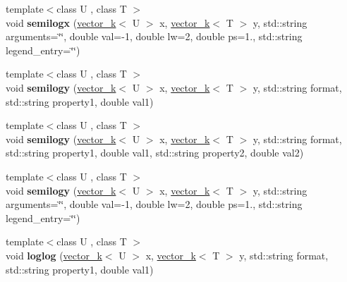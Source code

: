 \begin{DoxyCompactItemize}
\item 
\hypertarget{classkeycpp_1_1_figure_aade4dc8470fc4b3be109794494e91496}{{\footnotesize template$<$class U , class T $>$ }\\void {\bfseries semilogx} (\hyperlink{classkeycpp_1_1vector__k}{vector\-\_\-k}$<$ U $>$ x, \hyperlink{classkeycpp_1_1vector__k}{vector\-\_\-k}$<$ T $>$ y, std\-::string arguments=\char`\"{}\char`\"{}, double val=-\/1, double lw=2, double ps=1., std\-::string legend\-\_\-entry=\char`\"{}\char`\"{})}\label{classkeycpp_1_1_figure_aade4dc8470fc4b3be109794494e91496}

\item 
\hypertarget{classkeycpp_1_1_figure_a26d3fd1e2f41c9b74c9b853c43c6d08e}{{\footnotesize template$<$class U , class T $>$ }\\void {\bfseries semilogy} (\hyperlink{classkeycpp_1_1vector__k}{vector\-\_\-k}$<$ U $>$ x, \hyperlink{classkeycpp_1_1vector__k}{vector\-\_\-k}$<$ T $>$ y, std\-::string format, std\-::string property1, double val1)}\label{classkeycpp_1_1_figure_a26d3fd1e2f41c9b74c9b853c43c6d08e}

\item 
\hypertarget{classkeycpp_1_1_figure_a64d11674ab53a7017dbd1ad2748928f8}{{\footnotesize template$<$class U , class T $>$ }\\void {\bfseries semilogy} (\hyperlink{classkeycpp_1_1vector__k}{vector\-\_\-k}$<$ U $>$ x, \hyperlink{classkeycpp_1_1vector__k}{vector\-\_\-k}$<$ T $>$ y, std\-::string format, std\-::string property1, double val1, std\-::string property2, double val2)}\label{classkeycpp_1_1_figure_a64d11674ab53a7017dbd1ad2748928f8}

\item 
\hypertarget{classkeycpp_1_1_figure_a001bbf728ad18ea05da06315b56aa144}{{\footnotesize template$<$class U , class T $>$ }\\void {\bfseries semilogy} (\hyperlink{classkeycpp_1_1vector__k}{vector\-\_\-k}$<$ U $>$ x, \hyperlink{classkeycpp_1_1vector__k}{vector\-\_\-k}$<$ T $>$ y, std\-::string arguments=\char`\"{}\char`\"{}, double val=-\/1, double lw=2, double ps=1., std\-::string legend\-\_\-entry=\char`\"{}\char`\"{})}\label{classkeycpp_1_1_figure_a001bbf728ad18ea05da06315b56aa144}

\item 
\hypertarget{classkeycpp_1_1_figure_a248d3eb2d41456db865676a3d0b3faeb}{{\footnotesize template$<$class U , class T $>$ }\\void {\bfseries loglog} (\hyperlink{classkeycpp_1_1vector__k}{vector\-\_\-k}$<$ U $>$ x, \hyperlink{classkeycpp_1_1vector__k}{vector\-\_\-k}$<$ T $>$ y, std\-::string format, std\-::string property1, double val1)}\label{classkeycpp_1_1_figure_a248d3eb2d41456db865676a3d0b3faeb}


\end{DoxyCompactItemize}
